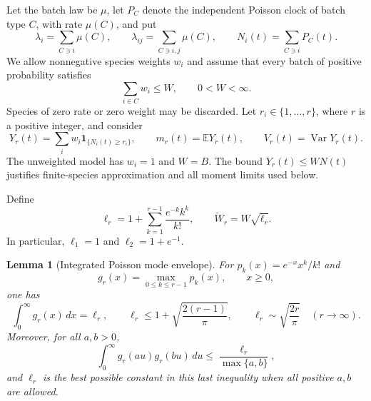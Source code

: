 \documentclass[11pt]{article}
\numberwithin{equation}{section}
\newtheorem{lemma}[theorem]{Lemma}
\theoremstyle{remark}
\begin{document}
Let the batch law be $\mu$, let $P_C$ denote the independent Poisson clock
of batch type $C$, with rate $\mu(C)$, and put
\[
 \lambda_i=\sum_{C\ni i}\mu(C),\qquad
 \lambda_{ij}=\sum_{C\ni i,j}\mu(C),\qquad
 N_i(t)=\sum_{C\ni i}P_C(t).
\]
We allow nonnegative species weights $w_i$ and assume that every batch of
positive probability satisfies
\begin{equation}\label{eq:threshold-weight-budget}
 \sum_{i\in C}w_i\le W,\qquad 0<W<\infty.
\end{equation}
Species of zero rate or zero weight may be discarded. Let $r_i\in\{1,\ldots,r\}$,
where $r$ is a positive integer, and consider
\[
 Y_r(t)=\sum_i w_i\boldsymbol 1_{\{N_i(t)\ge r_i\}},\qquad
 m_r(t)=\mathbb EY_r(t),\qquad V_r(t)=\operatorname{Var}Y_r(t).
\]
The unweighted model has $w_i=1$ and $W=B$.
The bound $Y_r(t)\le WN(t)$ justifies finite-species approximation and all
moment limits used below.

Define
\begin{equation}\label{eq:mode-envelope-constant}
 \ell_r=1+\sum_{k=1}^{r-1}\frac{e^{-k}k^k}{k!},\qquad
 \widetilde W_r=W\sqrt{\ell_r}.
\end{equation}
In particular, $\ell_1=1$ and $\ell_2=1+e^{-1}$.

\begin{lemma}[Integrated Poisson mode envelope]
\label{lem:poisson-mode-envelope}
For $p_k(x)=e^{-x}x^k/k!$ and
\[
 g_r(x)=\max_{0\le k\le r-1}p_k(x),\qquad x\ge0,
\]
one has
\begin{equation}\label{eq:integrated-mode-envelope}
 \int_0^\infty g_r(x)\,dx=\ell_r,
 \qquad
 \ell_r\le1+\sqrt{\frac{2(r-1)}\pi},
 \qquad
 \ell_r\sim\sqrt{\frac{2r}\pi}\quad(r\to\infty).
\end{equation}
Moreover, for all $a,b>0$,
\begin{equation}\label{eq:two-rate-mode-envelope}
 \int_0^\infty g_r(au)g_r(bu)\,du
 \le\frac{\ell_r}{\max\{a,b\}},
\end{equation}
and $\ell_r$ is the best possible constant in this last inequality when
all positive $a,b$ are allowed.
\end{lemma}
\end{document}
